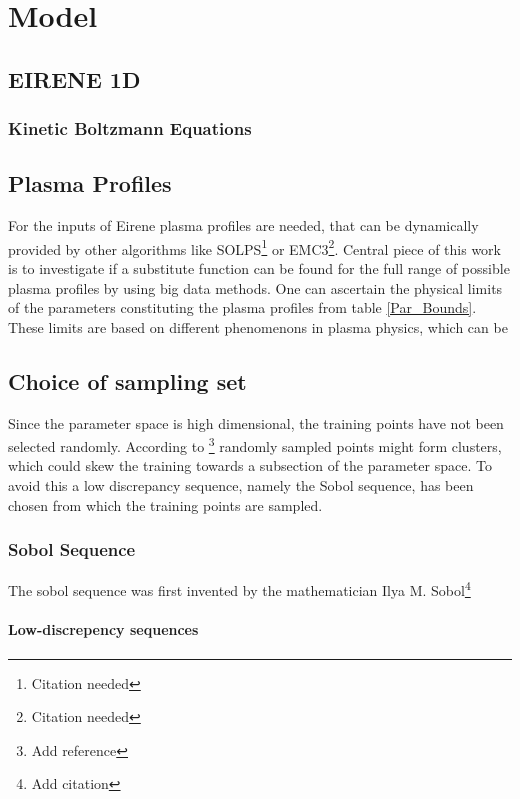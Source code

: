 \chapter{Model}
	\section{EIRENE 1D}
		\subsection{Kinetic Boltzmann Equations}
	\section{Plasma Profiles}
		For the inputs of Eirene plasma profiles are needed, that can be dynamically provided by other algorithms like SOLPS\footnote{Citation needed} or EMC3\footnote{Citation needed}. Central piece of this work is to investigate if a substitute function can be found for the full range of possible plasma profiles by using big data methods. One can ascertain the physical limits of the parameters constituting the plasma profiles from table \ref{Par_Bounds}. These limits are based on different phenomenons in plasma physics, which can be 
	\section{Choice of sampling set}
		Since the parameter space is high dimensional, the training points have not been selected randomly. According to \footnote{Add reference} randomly sampled points might form clusters, which could skew the training towards a subsection of the parameter space. To avoid this a low discrepancy sequence, namely the Sobol sequence, has been chosen from which the training points are sampled.
		\subsection{Sobol Sequence}
			The sobol sequence was first invented by the mathematician Ilya M. Sobol\footnote{Add citation} 
			\subsubsection{Low-discrepency sequences}